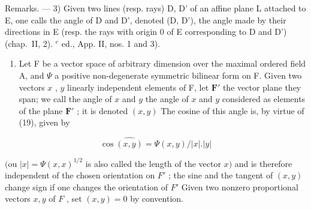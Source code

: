 Remarks. --- 3) Given two lines (resp. rays) D, D' of an affine plane L attached to E, one calls the angle of D and D', denoted (D, D'), the angle made by their directions in E (resp. the rays with origin 0 of E corresponding to D and D') (chap.~II, 2). \(^{e}\) ed., App. II, nos. 1 and 3).

\begin{enumerate}
\def\labelenumi{\arabic{enumi})}
\setcounter{enumi}{3}
\tightlist
\item
  Let F be a vector space of arbitrary dimension over the maximal ordered field A, and \(\Psi\) a positive non-degenerate symmetric bilinear form on F. Given two vectors \(x\) , \(y\) linearly independent elements of F, let \(\mathbf{F}'\) the vector plane they span; we call the angle of \(x\) and \(y\) the angle of \(x\) and \(y\) considered as elements of the plane \(\mathbf{F}'\) ; it is denoted \((x,y)\) The cosine of this angle is, by virtue of (19), given by
\end{enumerate}

\[
\cos \widehat {(x , y)} = \Psi (x, y) / | x |. | y |\tag{21}
\]

\((\text{ou } |x| = \Psi(x, x)^{1/2}\) is also called the length of the vector \(x)\) and is therefore independent of the chosen orientation on \(F'\) ; the sine and the tangent of \((x, y)\) change sign if one changes the orientation of \(F'\) Given two nonzero proportional vectors \(x, y\) of \(F\) , set \((x, y) = 0\) by convention.
\relax{}
